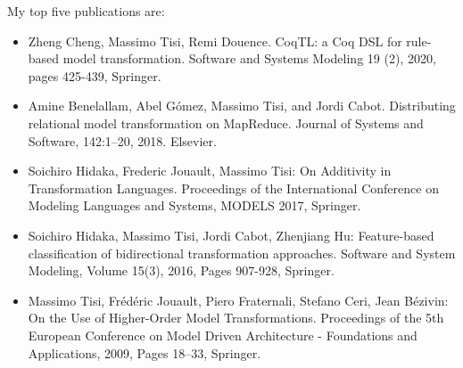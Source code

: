 \medskip
My top five publications are:
\begin{itemize}
\item Zheng Cheng, Massimo Tisi, Remi Douence. CoqTL: a Coq DSL for rule-based model transformation. Software and Systems Modeling 19 (2), 2020, pages 425-439, Springer.
\item Amine Benelallam, Abel Gómez, Massimo Tisi, and Jordi Cabot. Distributing relational model transformation on MapReduce. Journal of Systems and Software, 142:1–20, 2018. Elsevier.
\item Soichiro Hidaka, Frederic Jouault, Massimo Tisi: On Additivity in Transformation Languages. Proceedings of the International Conference on Modeling Languages and Systems, MODELS 2017, Springer.
\item Soichiro Hidaka, Massimo Tisi, Jordi Cabot, Zhenjiang Hu: Feature-based classification of bidirectional transformation approaches. Software and System Modeling, Volume 15(3), 2016, Pages 907-928, Springer.
\item Massimo Tisi, Frédéric Jouault, Piero Fraternali, Stefano Ceri, Jean Bézivin: On the Use of Higher-Order Model Transformations. Proceedings of the 5th European Conference on Model Driven Architecture - Foundations and Applications, 2009, Pages 18–33, Springer.
\end{itemize}

